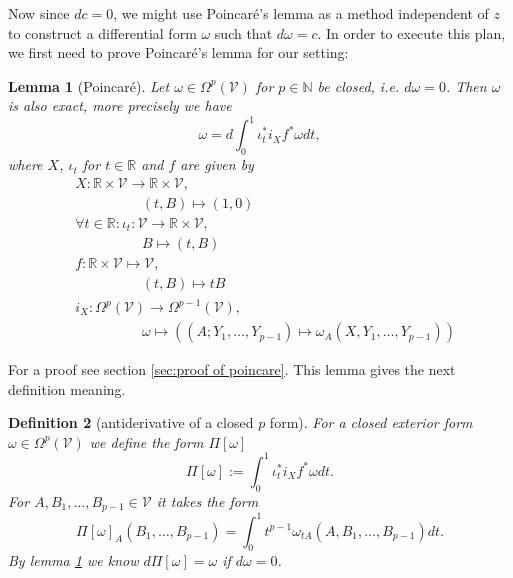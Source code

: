 \documentclass[b5paper,draft,openbib,12pt]{memoir}
\newtheorem{Def}{Definition}
\newtheorem{Lemma}[Def]{Lemma}
\begin{document}
Now since \(d c=0\), we might use Poincaré's lemma as a method independent of \(z\) to construct a differential form \(\omega\) such that \(d\omega=c\). 
In order to execute this plan, we first need to prove Poincaré's lemma for our setting:

\begin{Lemma}[Poincaré]\label{lem poincare}
Let \(\omega\in \Omega^p(\mathcal{V})\) for 
\(p\in\mathbb{N}\) be closed, i.e. \(d \omega =0\). 
Then \(\omega\) is also exact, more precisely we have
\begin{equation}
\omega=d \int_{0}^1 \iota^*_t i_X f^* \omega dt,
\end{equation}
where \(X\), \(\iota_t\) for \(t\in\mathbb{R}\) and \(f\) are given by
 \begin{align}
 &X: \mathbb{R}\times\mathcal{V}\rightarrow \mathbb{R}\times\mathcal{V},\\
 &\hspace{2cm} (t,B)\mapsto (1,0) \\
&\forall t \in \mathbb{R}: \iota_t: \mathcal{V}\rightarrow \mathbb{R}\times\mathcal{V},\\
&\hspace{2cm} B\mapsto (t,B)\\
&f:\mathbb{R}\times \mathcal{V}\mapsto \mathcal{V},\\
&\hspace{2cm} (t,B) \mapsto t B\\
&i_X: \Omega^p(\mathcal{V})\rightarrow \Omega^{p-1}(\mathcal{V}),\\
&\hspace{2cm} \omega \mapsto ((A;Y_1,\dots, Y_{p-1})\mapsto \omega_A(X,Y_1,\dots,Y_{p-1}))
 \end{align}
\end{Lemma}
For a proof see section \ref{sec:proof of poincare}. This 
lemma gives the next definition meaning.

\begin{Def}[antiderivative of a closed \(p\) form]\label{antiderivative}
For a closed exterior form \(\omega\in\Omega^{p}(\mathcal{V})\) we define the form \(\Pi [\omega]\)
\begin{equation}
\Pi\![\omega]:=\int_{0}^1 \iota^*_t i_X f^* \omega dt.
\end{equation}
For \(A,B_1,\dots , B_{p-1}\in\mathcal{V}\) it takes the form 
\begin{equation}
\Pi\![\omega]_A(B_1,\dots, B_{p-1})=\int_0^1 t^{p-1} \omega_{tA}(A,B_1,\dots, B_{p-1})dt.
\end{equation}
By lemma \ref{lem poincare} we know \(d\Pi [\omega]=\omega\) if \(d\omega=0\).
\end{Def}
\end{document}
